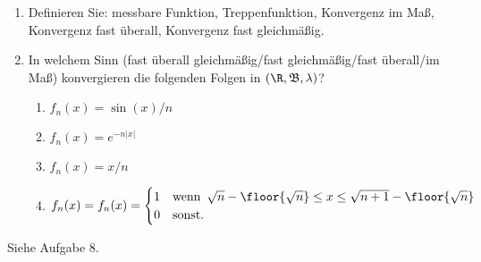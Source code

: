 
\begin{exercise}

\phantom{}

\begin{enumerate}[label = (\alph*)]

  \item
  Definieren Sie: messbare Funktion, Treppenfunktion, Konvergenz im Maß, Konvergenz fast überall, Konvergenz fast gleichmäßig.
  
  \item
  In welchem Sinn (fast überall gleichmäßig/fast gleichmäßig/fast überall/im Maß) konvergieren die folgenden Folgen in $(\R, \mathfrak{B}, \lambda)$?
  
  \begin{enumerate}[label = \roman*.]

    \item
    $f_n(x) = \sin(x)/n$

    \item
    $f_n(x) = e^{-n |x|}$
    
    \item
    $f_n(x) = x/n$
    
    \item
    $f_n(x) = f_n(x) =
    \begin{cases}
      1 & \text{wenn} \enspace \sqrt{n} - \floor{\sqrt{n}} \leq x \leq \sqrt{n+1} - \floor{\sqrt{n}} \\
      0 & \text{sonst}.
    \end{cases}$

  \end{enumerate}

\end{enumerate}

\end{exercise}


\begin{solution}

Siehe Aufgabe 8.

\end{solution}

